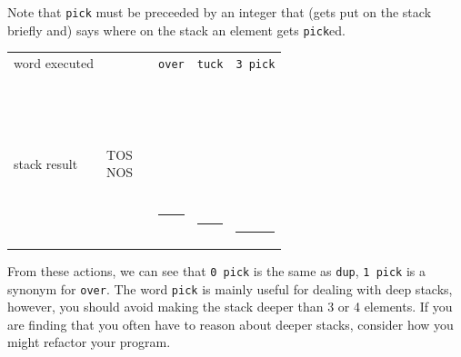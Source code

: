 \documentclass[12pt,a4paper]{article}
\begin{document}
Note that \verb!pick! must be preceeded by an integer that (gets put on the stack briefly and) 
says where on the stack an element gets \verb!pick!ed.
\begin{center}
 \begin{tabular}{lc|cccc}
 word executed & & & \verb!over! & \verb!tuck! & \verb!3 pick! \\
 \\
 stack result  
 & \parbox[t]{35pt}{TOS \\ NOS} 
 & \parbox[t]{30pt}{ \\  \\  \\  \\ \rule{30pt}{2pt}} 
 & \parbox[t]{30pt}{ \\  \\  \\  \\  \\ \rule{30pt}{2pt}}
 & \parbox[t]{30pt}{ \\  \\  \\  \\  \\  \\ \rule{30pt}{2pt}}
 & \parbox[t]{30pt}{ \\  \\  \\  \\  \\  \\  \\ \rule{30pt}{2pt}}
 \end{tabular}

\end{center}
From these actions, we can see that \verb!0 pick! is the same as \verb!dup!,
\verb!1 pick! is a synonym for \verb!over!.
The word \verb!pick! is mainly useful for dealing with deep stacks, however,
you should avoid making the stack deeper than 3 or 4 elements.
If you are finding that you often have to reason about deeper stacks, 
consider how you might refactor your program.
\end{document}
